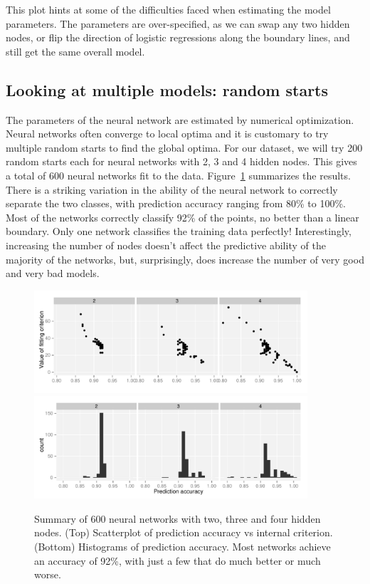 \documentclass[preprint]{imsart}
\begin{document}
This plot hints at some of the difficulties faced when estimating the model parameters.  The parameters are over-specified, as we can swap any two hidden nodes, or flip the direction of logistic regressions along the boundary lines, and still get the same overall model.

\subsection{Looking at multiple models: random starts}
\label{sub:starts}

The parameters of the neural network are estimated by numerical optimization.  Neural networks often converge to local optima and it is customary to try multiple random starts to find the global optima.  For our dataset, we will try 200 random starts each for neural networks with 2, 3 and 4 hidden nodes.  This gives a total of 600 neural networks fit to the data.   Figure~\ref{fig:nnet-many} summarizes the results. There is a striking variation in the ability of the neural network to correctly separate the two classes, with prediction accuracy ranging from 80\% to 100\%.  Most of the networks correctly classify 92\% of the points, no better than a linear boundary.  Only one network classifies the training data perfectly!  Interestingly, increasing the number of nodes doesn't affect the predictive ability of the majority of the networks, but, surprisingly, does increase the number of very good and very bad models.

\begin{figure}[htbp]
  \centering
    \includegraphics[width=4in]{nnet-value-accuracy}
    \includegraphics[width=4in]{nnet-accuracy}
  \caption{Summary of 600 neural networks with two, three and four hidden nodes.  (Top) Scatterplot of prediction accuracy vs internal criterion.  (Bottom) Histograms of prediction accuracy.  Most networks achieve an accuracy of 92\%, with just a few that do much better or much worse.}
  \label{fig:nnet-many}
\end{figure}
\end{document}
